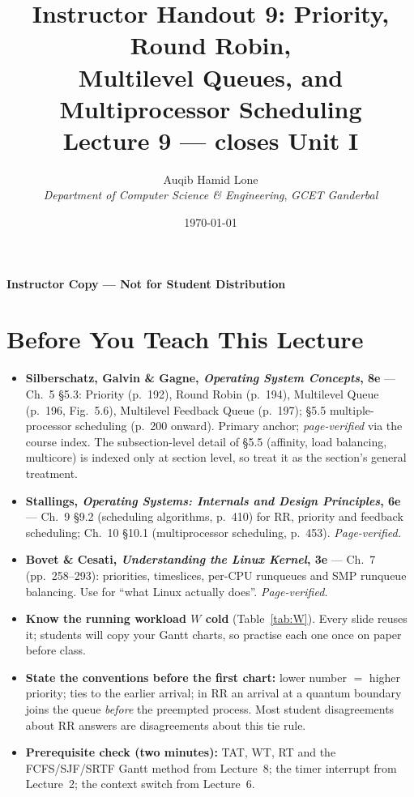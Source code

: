 \documentclass[11pt]{article}
\title{Instructor Handout 9: Priority, Round Robin,\\Multilevel Queues, and Multiprocessor Scheduling\\[0.3em]
  \large Lecture 9 --- closes Unit I}
\author{Auqib Hamid Lone\\[0.3em]
  \emph{Department of Computer Science \& Engineering}, \emph{GCET Ganderbal}}
\date{\today}
\begin{document}
\maketitle
{\centering\large\color{negative}\textbf{Instructor Copy --- Not for Student Distribution}\par}
\vspace{0.5cm}

\section{Before You Teach This Lecture}

\begin{itemize}
  \item \textbf{Silberschatz, Galvin \& Gagne, \textit{Operating System Concepts}, 8e} --- Ch.~5 \S5.3: Priority (p.~192), Round Robin (p.~194), Multilevel Queue (p.~196, Fig.~5.6), Multilevel Feedback Queue (p.~197); \S5.5 multiple-processor scheduling (p.~200 onward). Primary anchor; \emph{page-verified} via the course index. The subsection-level detail of \S5.5 (affinity, load balancing, multicore) is indexed only at section level, so treat it as the section's general treatment.
  \item \textbf{Stallings, \textit{Operating Systems: Internals and Design Principles}, 6e} --- Ch.~9 \S9.2 (scheduling algorithms, p.~410) for RR, priority and feedback scheduling; Ch.~10 \S10.1 (multiprocessor scheduling, p.~453). \emph{Page-verified.}
  \item \textbf{Bovet \& Cesati, \textit{Understanding the Linux Kernel}, 3e} --- Ch.~7 (pp.~258--293): priorities, timeslices, per-CPU runqueues and SMP runqueue balancing. Use for ``what Linux actually does''. \emph{Page-verified.}
  \item \textbf{Know the running workload $W$ cold} (Table~\ref{tab:W}). Every slide reuses it; students will copy your Gantt charts, so practise each one once on paper before class.
  \item \textbf{State the conventions before the first chart:} lower number $=$ higher priority; ties to the earlier arrival; in RR an arrival at a quantum boundary joins the queue \emph{before} the preempted process. Most student disagreements about RR answers are disagreements about this tie rule.
  \item \textbf{Prerequisite check (two minutes):} TAT, WT, RT and the FCFS/SJF/SRTF Gantt method from Lecture~8; the timer interrupt from Lecture~2; the context switch from Lecture~6.
\end{itemize}
\end{document}
